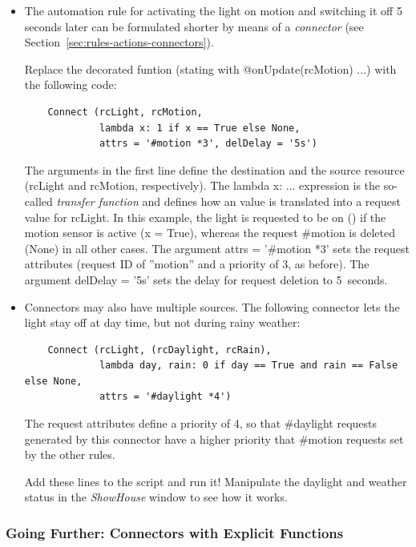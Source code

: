 \documentclass[12pt,english,parskip=half,headheight=19pt]{scrreprt}
\newcommand{\lst}[1]{\colorbox{lstbackground}{\footnotesize\code{#1}}}
\newcommand{\lstf}[1]{\colorbox{lstbackground}{\ttfamily\footnotesize#1}}
\begin{document}
\begin{itemize}[$\blacktriangleright$]

\item
  The automation rule for activating the light on motion and switching it off 5 seconds later can
  be formulated shorter by means of a \textit{connector} (see Section~\ref{sec:rules-actions-connectors}).

  Replace the decorated funtion (stating with \lstf{@onUpdate(rcMotion) ...}) with the following code:
  \begin{lstlisting}
    Connect (rcLight, rcMotion,
             lambda x: 1 if x == True else None,
             attrs = '#motion *3', delDelay = '5s')
  \end{lstlisting}

  The arguments in the first line define the destination and the source resource (\lstf{rcLight} and
  \lstf{rcMotion}, respectively).
  The \lstf{lambda x: ...} expression is the so-called \textit{transfer function} and defines
  how an \lst{rcMotion} value is translated into a request value for \lstf{rcLight}. In this
  example, the light is requested to be on (\lst{1}) if the motion sensor is active
  (\lstf{x = True}), whereas the request \lstf{\#motion} is deleted (\lstf{None}) in all
  other cases.
  The argument \lstf{attrs = '\#motion *3'} sets the request attributes (request ID of ''motion'' and
  a priority of 3, as before). The argument \lstf{delDelay = '5s'} sets the delay for request deletion to
  5~seconds.

\item
  Connectors may also have multiple sources.
  The following connector lets the light stay off at day time, but not during rainy weather:
  \begin{lstlisting}
    Connect (rcLight, (rcDaylight, rcRain),
             lambda day, rain: 0 if day == True and rain == False else None,
             attrs = '#daylight *4')
  \end{lstlisting}
  The request attributes define a priority of 4, so that \lstf{\#daylight} requests generated by this
  connector have a higher priority that \lstf{\#motion} requests set by the other rules.

  Add these lines to the script and run it! Manipulate the daylight and weather status in the
  \textit{ShowHouse} window to see how it works.

\end{itemize}


\subsubsection*{Going Further: Connectors with Explicit Functions}
\end{document}
